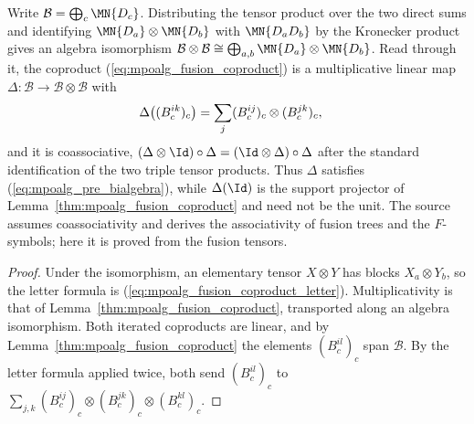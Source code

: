 \begin{lemma}%
    \label{thm:mpoalg_fusion_coproduct_coassoc}
    \leanok
    Write $\mathcal B=\bigoplus_c\MN{D_c}$. Distributing the tensor product
    over the two direct sums and identifying $\MN{D_a}\otimes\MN{D_b}$ with
    $\MN{D_aD_b}$ by the Kronecker product gives an algebra isomorphism
    $\mathcal B\otimes\mathcal B\cong\bigoplus_{a,b}\MN{D_a}\otimes\MN{D_b}$.
    Read through it, the coproduct (\ref{eq:mpoalg_fusion_coproduct}) is a
    multiplicative linear map $\Delta\colon\mathcal B\to\mathcal B\otimes\mathcal B$
    with
    \begin{align}
        \Delta\big((B_c^{ik})_c\big)
         & =\sum_j(B_c^{ij})_c\otimes(B_c^{jk})_c,
        \notag
    \end{align}
    and it is coassociative,
    $(\Delta\otimes\Id)\circ\Delta=(\Id\otimes\Delta)\circ\Delta$ after
    the standard identification of the two triple tensor products. Thus
    $\Delta$ satisfies (\ref{eq:mpoalg_pre_bialgebra}), while $\Delta(\Id)$
    is the support projector of Lemma~\ref{thm:mpoalg_fusion_coproduct} and
    need not be the unit. The source assumes
    coassociativity and derives the associativity of fusion trees and the
    $F$-symbols; here it is proved from the fusion tensors.
\end{lemma}

\begin{proof}
    \leanok
    Under the isomorphism, an elementary tensor $X\otimes Y$ has blocks
    $X_a\otimes Y_b$, so the letter formula is
    (\ref{eq:mpoalg_fusion_coproduct_letter}). Multiplicativity is that of
    Lemma~\ref{thm:mpoalg_fusion_coproduct}, transported along an algebra
    isomorphism. Both iterated coproducts are linear, and by
    Lemma~\ref{thm:mpoalg_fusion_coproduct} the elements $(B_c^{il})_c$
    span $\mathcal B$. By the letter formula applied twice, both send
    $(B_c^{il})_c$ to
    $\sum_{j,k}(B_c^{ij})_c\otimes(B_c^{jk})_c\otimes(B_c^{kl})_c$.
\end{proof}

